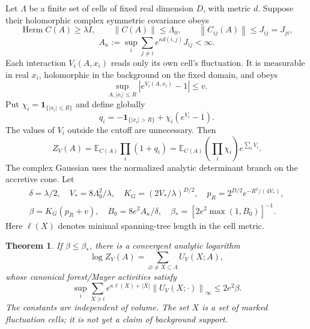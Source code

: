 \documentclass[11pt]{article}
\newtheorem{theorem}{Theorem}[section]
\theoremstyle{remark}
\newcommand{\E}{\mathbb E}
\newcommand{\norm}[1]{\left\|#1\right\|}
\newcommand{\Herm}{\operatorname{Herm}}
\begin{document}
Let $\Lambda$ be a finite set of cells of fixed real dimension $D$,
with metric $d$. Suppose their holomorphic complex symmetric covariance
obeys
\[
 \Herm C(A)\ge\lambda I,\qquad \norm{C(A)}\le\Lambda_0,
 \qquad \norm{C_{ij}(A)}\le J_{ij}=J_{ji},
\]
\[
 A_\kappa:=\sup_i\sum_{j\ne i}e^{\kappa d(i,j)}J_{ij}<\infty.
\]
Each interaction $V_i(A,x_i)$ reads only its own cell's fluctuation.
It is measurable in real $x_i$, holomorphic in the background on the
fixed domain, and obeys
\[
 \sup_{A,|x_i|\le R}|e^{V_i(A,x_i)}-1|\le v.
\]
Put $\chi_i=\mathbf1_{\{|x_i|\le R\}}$ and define globally
\[
 q_i=-\mathbf1_{\{|x_i|>R\}}+\chi_i(e^{V_i}-1).
\]
The values of $V_i$ outside the cutoff are unnecessary. Then
\[
 Z_V(A)=\E_{C(A)}\prod_i(1+q_i)
       =\E_{C(A)}\left(\prod_i\chi_i\right)e^{\sum_iV_i}.
\]
The complex Gaussian uses the normalized analytic determinant branch
on the accretive cone. Let
\begin{gather*}
 \delta=\lambda/2,\quad V_*=8\Lambda_0^2/\lambda,
 \quad K_G=(2V_*/\lambda)^{D/2},
 \quad p_R=2^{D/2}e^{-R^2/(4V_*)},\\
 \beta=K_G(p_R+v),\quad B_0=8e^2A_\kappa/\delta,
 \quad \beta_*=[2e^2\max(1,B_0)]^{-1}.
\end{gather*}
Here $\ell(X)$ denotes minimal spanning-tree length in the cell metric.

\begin{theorem}\label{thm:cell-interaction}
If $\beta\le\beta_*$, there is a convergent analytic logarithm
\[
 \log Z_V(A)=\sum_{\varnothing\ne X\subset\Lambda}U_V(X;A),
\]
whose canonical forest/Mayer activities satisfy
\begin{equation}\label{eq:cell-log}
 \sup_i\sum_{X\ni i}e^{\kappa\ell(X)+|X|}
                         \norm{U_V(X;\cdot)}_\infty\le2e^2\beta.
\end{equation}
The constants are independent of volume. The set $X$ is a set of
marked fluctuation cells; it is not yet a claim of background support.
\end{theorem}
\end{document}
